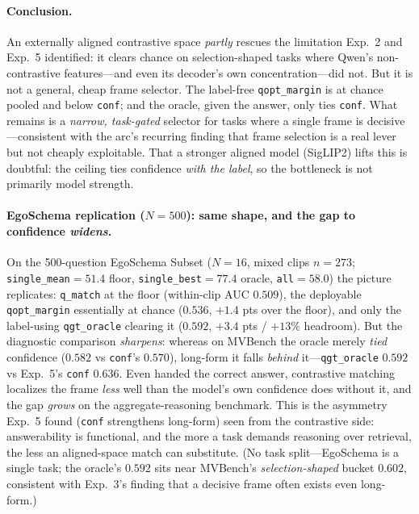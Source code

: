 \documentclass[11pt]{article}
\begin{document}
\paragraph{Conclusion.} An externally aligned contrastive space \emph{partly} rescues the
limitation Exp.~2 and Exp.~5 identified: it clears chance on selection-shaped tasks where
Qwen's non-contrastive features---and even its decoder's own concentration---did not. But it is
not a general, cheap frame selector. The label-free \texttt{qopt\_margin} is at chance pooled
and below \texttt{conf}; and the oracle, given the answer, only ties \texttt{conf}. What remains
is a \emph{narrow, task-gated} selector for tasks where a single frame is decisive---consistent
with the arc's recurring finding that frame selection is a real lever but not cheaply
exploitable. That a stronger aligned model (SigLIP2) lifts this is doubtful: the ceiling ties
confidence \emph{with the label}, so the bottleneck is not primarily model strength.

\paragraph{EgoSchema replication ($N{=}500$): same shape, and the gap to confidence
\emph{widens}.} On the 500-question EgoSchema Subset ($N{=}16$, mixed clips $n{=}273$;
\texttt{single\_mean}$=51.4$ floor, \texttt{single\_best}$=77.4$ oracle, \texttt{all}$=58.0$)
the picture replicates: \texttt{q\_match} at the floor (within-clip AUC $0.509$), the deployable
\texttt{qopt\_margin} essentially at chance ($0.536$, $+1.4$ pts over the floor), and only the
label-using \texttt{qgt\_oracle} clearing it ($0.592$, $+3.4$ pts / $+13\%$ headroom). But the
diagnostic comparison \emph{sharpens}: whereas on MVBench the oracle merely \emph{tied}
confidence ($0.582$ vs \texttt{conf}'s $0.570$), long-form it falls \emph{behind}
it---\texttt{qgt\_oracle} $0.592$ vs Exp.~5's \texttt{conf} $0.636$. Even handed the correct
answer, contrastive matching localizes the frame \emph{less} well than the model's own
confidence does without it, and the gap \emph{grows} on the aggregate-reasoning benchmark. This
is the asymmetry Exp.~5 found (\texttt{conf} strengthens long-form) seen from the contrastive
side: answerability is functional, and the more a task demands reasoning over retrieval, the
less an aligned-space match can substitute. (No task split---EgoSchema is a single task; the
oracle's $0.592$ sits near MVBench's \emph{selection-shaped} bucket $0.602$, consistent with
Exp.~3's finding that a decisive frame often exists even long-form.)
\end{document}
